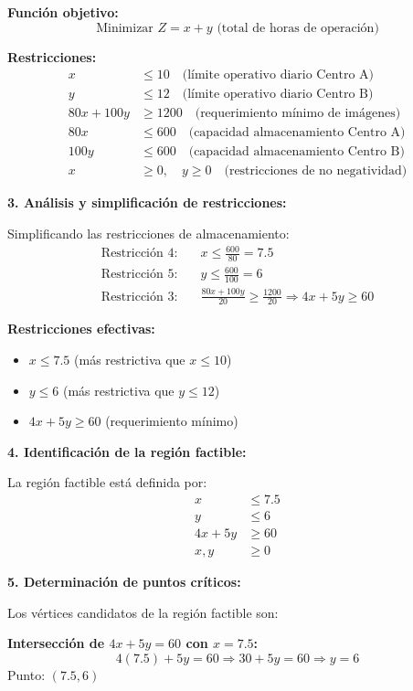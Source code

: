 \documentclass[12pt,a4paper]{article}
\begin{document}
\textbf{Función objetivo:}
\[
\text{Minimizar } Z = x + y \text{ (total de horas de operación)}
\]

\textbf{Restricciones:}
\begin{align}
x &\leq 10 \quad \text{(límite operativo diario Centro A)}\\
y &\leq 12 \quad \text{(límite operativo diario Centro B)}\\
80x + 100y &\geq 1200 \quad \text{(requerimiento mínimo de imágenes)}\\
80x &\leq 600 \quad \text{(capacidad almacenamiento Centro A)}\\
100y &\leq 600 \quad \text{(capacidad almacenamiento Centro B)}\\
x &\geq 0, \quad y \geq 0 \quad \text{(restricciones de no negatividad)}
\end{align}

\textbf{3. Análisis y simplificación de restricciones:}

Simplificando las restricciones de almacenamiento:
\begin{align}
\text{Restricción 4:} \quad &x \leq \frac{600}{80} = 7.5\\
\text{Restricción 5:} \quad &y \leq \frac{600}{100} = 6\\
\text{Restricción 3:} \quad &\frac{80x + 100y}{20} \geq \frac{1200}{20} \Rightarrow 4x + 5y \geq 60
\end{align}

\textbf{Restricciones efectivas:}
\begin{itemize}
\item $x \leq 7.5$ (más restrictiva que $x \leq 10$)
\item $y \leq 6$ (más restrictiva que $y \leq 12$)
\item $4x + 5y \geq 60$ (requerimiento mínimo)
\end{itemize}

\textbf{4. Identificación de la región factible:}

La región factible está definida por:
\begin{align}
x &\leq 7.5\\
y &\leq 6\\
4x + 5y &\geq 60\\
x, y &\geq 0
\end{align}

\textbf{5. Determinación de puntos críticos:}

Los vértices candidatos de la región factible son:

\textbf{Intersección de $4x + 5y = 60$ con $x = 7.5$:}
\[
4(7.5) + 5y = 60 \Rightarrow 30 + 5y = 60 \Rightarrow y = 6
\]
Punto: $(7.5, 6)$
\end{document}
